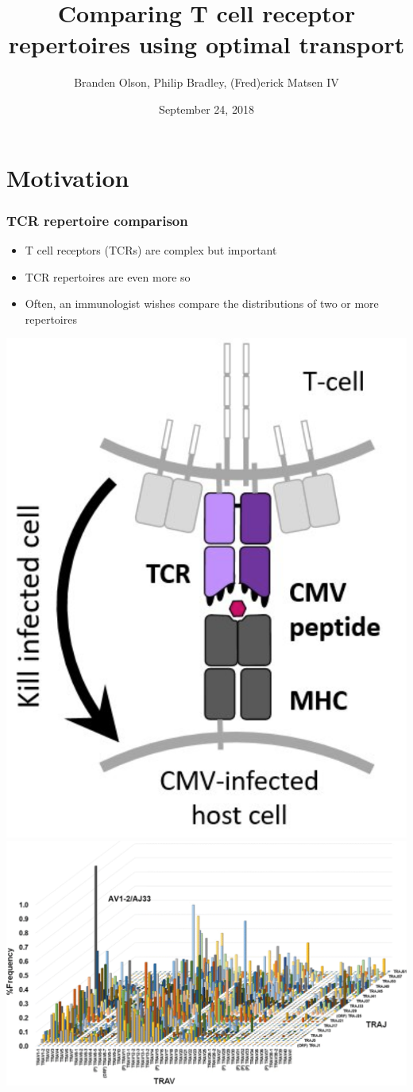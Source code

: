\documentclass[mathserif,compress,xcolor={dvipsnames}]{beamer}
\title[]{Comparing T cell receptor repertoires using optimal transport}
\author[]
{Branden Olson, Philip Bradley, (Fred)erick Matsen IV}
\date[Sept. 24, 2018]
{September 24, 2018}
\institute[]
{
Fred Hutch
}
\renewcommand\;{\,}
\begin{document}
\begin{frame}[noframenumbering]
  \titlepage
\end{frame}

\section{Motivation}

\begin{frame}\frametitle{TCR repertoire comparison}
\begin{minipage}{0.45\linewidth}
\begin{itemize}
\item
T cell receptors (TCRs) are complex but important
\bigskip
\item
TCR repertoires are even more so
\bigskip
\item Often, an immunologist wishes compare the distributions of two or more repertoires
\end{itemize}
\end{minipage}
\begin{minipage}{0.53\linewidth}
\begin{center}
\includegraphics[width=0.6\linewidth]{Figures/TCR.png}
\\
\includegraphics[width=0.8\linewidth]{Figures/TCRRepertoire.png}
\end{center}
\end{minipage}
\end{frame}
\end{document}
